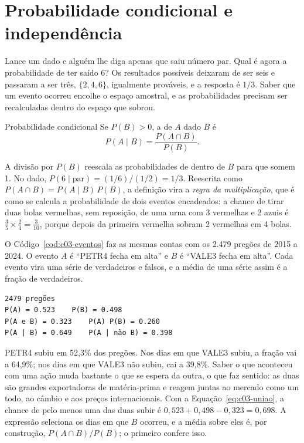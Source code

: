 \section{Probabilidade condicional e independência}
\label{sec:c03-condicional}

Lance um dado e alguém lhe diga apenas que saiu número par. Qual é agora a probabilidade de ter saído 6? Os resultados possíveis deixaram de ser seis e passaram a ser três, $\{2, 4, 6\}$, igualmente prováveis, e a resposta é $1/3$. Saber que um evento ocorreu encolhe o espaço amostral, e as probabilidades precisam ser recalculadas dentro do espaço que sobrou.

\begin{definicao}{Probabilidade condicional}
Se $P(B) > 0$, a  de $A$ dado $B$ é
\begin{equation}
  P(A \mid B) = \frac{P(A \cap B)}{P(B)} .
  \label{eq:c03-condicional}
\end{equation}
\end{definicao}

A divisão por $P(B)$ reescala as probabilidades de dentro de $B$ para que somem 1. No dado, $P(6 \mid \text{par}) = (1/6)/(1/2) = 1/3$. Reescrita como $P(A \cap B) = P(A \mid B)\,P(B)$, a definição vira a \emph{regra da multiplicação}, que é como se calcula a probabilidade de dois eventos encadeados: a chance de tirar duas bolas vermelhas, sem reposição, de uma urna com 3 vermelhas e 2 azuis é $\frac{3}{5} \times \frac{2}{4} = \frac{3}{10}$, porque depois da primeira vermelha sobram 2 vermelhas em 4 bolas.

O Código~\ref{cod:c03-eventos} faz as mesmas contas com os 2.479 pregões de 2015 a 2024. O evento $A$ é ``PETR4 fecha em alta'' e $B$ é ``VALE3 fecha em alta''. Cada evento vira uma série de verdadeiros e falsos, e a média de uma série assim é a fração de verdadeiros.


\begin{lstlisting}[style=saida]
2479 pregões
P(A) = 0.523    P(B) = 0.498
P(A e B) = 0.323    P(A) P(B) = 0.260
P(A | B) = 0.649    P(A | não B) = 0.398
\end{lstlisting}

PETR4 subiu em 52,3\% dos pregões. Nos dias em que VALE3 subiu, a fração vai a 64,9\%; nos dias em que VALE3 não subiu, cai a 39,8\%. Saber o que aconteceu com uma ação muda bastante o que se espera da outra, o que faz sentido: as duas são grandes exportadoras de matéria-prima e reagem juntas ao mercado como um todo, ao câmbio e aos preços internacionais. Com a Equação~\eqref{eq:c03-uniao}, a chance de pelo menos uma das duas subir é $0,523 + 0,498 - 0,323 = 0,698$. A expressão  seleciona os dias em que $B$ ocorreu, e a média sobre eles é, por construção, $P(A \cap B)/P(B)$; o primeiro  confere isso.

